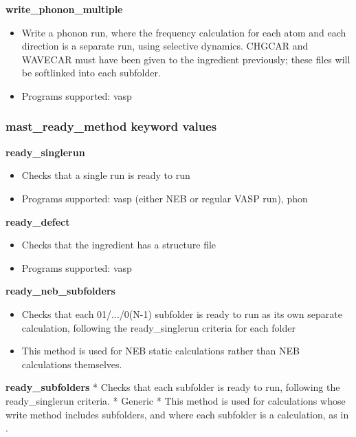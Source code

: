\documentclass[letterpaper,10pt,english]{sphinxmanual}
\begin{document}
\textbf{write\_phonon\_multiple}
\begin{itemize}
\item {} 
Write a phonon run, where the frequency calculation for each atom and each direction is a separate run, using selective dynamics. CHGCAR and WAVECAR must have been given to the ingredient previously; these files will be softlinked into each subfolder.

\item {} 
Programs supported: vasp

\end{itemize}


\subsubsection{mast\_ready\_method keyword values}
\label{3_0_inputfile:mast-ready-method-keyword-values}
\textbf{ready\_singlerun}
\begin{itemize}
\item {} 
Checks that a single run is ready to run

\item {} 
Programs supported: vasp (either NEB or regular VASP run), phon

\end{itemize}

\textbf{ready\_defect}
\begin{itemize}
\item {} 
Checks that the ingredient has a structure file

\item {} 
Programs supported: vasp

\end{itemize}

\textbf{ready\_neb\_subfolders}
\begin{itemize}
\item {} 
Checks that each 01/.../0(N-1) subfolder is ready to run as its own separate calculation, following the ready\_singlerun criteria for each folder

\item {} 
This method is used for NEB static calculations rather than NEB calculations themselves.

\end{itemize}

\textbf{ready\_subfolders}
*  Checks that each subfolder is ready to run, following the ready\_singlerun criteria.
*  Generic
*  This method is used for calculations whose write method includes subfolders, and where each subfolder is a calculation, as in .
\end{document}
